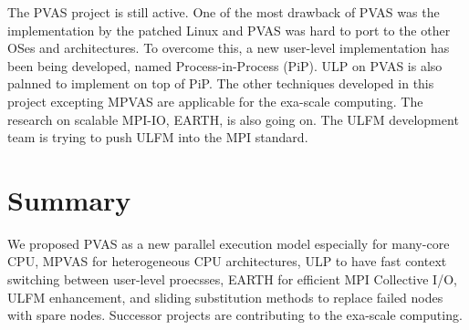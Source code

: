 The PVAS project is still active. One of the most drawback of PVAS was
the implementation by the patched Linux and PVAS was hard to port to the
other OSes and architectures. To overcome this, a new
user-level implementation has been being developed, named
Process-in-Process (PiP)\cite{hori:hpdc2018}. ULP on PVAS is also
palnned to implement on top of PiP.
The other techniques developed in this project excepting MPVAS are
applicable for the exa-scale computing. The research on scalable
MPI-IO, EARTH, is also going on. The ULFM development team is
trying to push ULFM into the MPI standard.

\section{Summary}

We proposed PVAS as a new parallel execution model especially for
many-core CPU, MPVAS for heterogeneous CPU architectures, ULP to have
fast context switching between user-level proecsses, EARTH for
efficient MPI Collective I/O, ULFM enhancement, and sliding
substitution methods to replace failed nodes with spare nodes.
Successor projects are contributing to the exa-scale computing.
